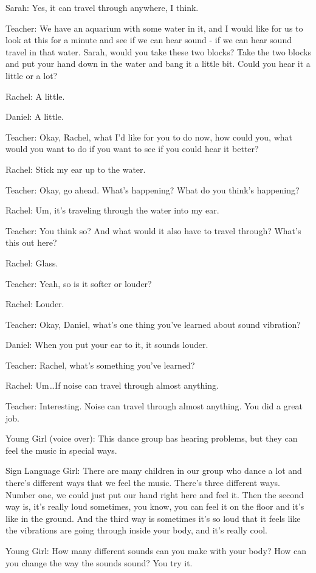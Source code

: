 Sarah: Yes, it can travel through anywhere, I think.

Teacher: We have an aquarium with some water in it, and I would like for us to look at this for a minute and see if we can hear sound - if we can hear sound travel in that water. Sarah, would you take these two blocks? Take the two blocks and put your hand down in the water and bang it a little bit. Could you hear it a little or a lot?

Rachel: A little.

Daniel: A little.

Teacher: Okay, Rachel, what I'd like for you to do now, how could you, what would you want to do if you want to see if you could hear it better?

Rachel: Stick my ear up to the water.

Teacher: Okay, go ahead. What's happening? What do you think's happening?

Rachel: Um, it's traveling through the water into my ear.

Teacher: You think so? And what would it also have to travel through? What's this out here?

Rachel: Glass.

Teacher: Yeah, so is it softer or louder?

Rachel: Louder.

Teacher: Okay, Daniel, what's one thing you've learned about sound vibration?

Daniel: When you put your ear to it, it sounds louder.

Teacher: Rachel, what's something you've learned?

Rachel: Um\dots If noise can travel through almost anything.

Teacher: Interesting. Noise can travel through almost anything. You did a great job.

Young Girl (voice over): This dance group has hearing problems, but they can feel the music in special ways.

Sign Language Girl: There are many children in our group who dance a lot and there's different ways that we feel the music. There's three different ways. Number one, we could just put our hand right here and feel it. Then the second way is, it's really loud sometimes, you know, you can feel it on the floor and it's like in the ground. And the third way is sometimes it's so loud that it feels like the vibrations are going through inside your body, and it's really cool.

Young Girl: How many different sounds can you make with your body? How can you change the way the sounds sound? You try it.

